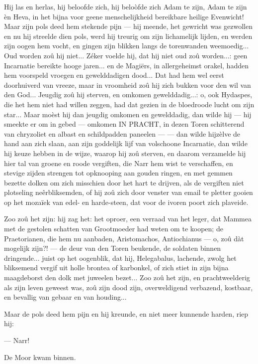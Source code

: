 \documentclass[a4paper, 12pt, oneside, dutch]{article}
\begin{document}
Hij las en herlas, hij beloofde zich, hij beloòfde zich Adam te zijn, Adam te zijn èn Heva, in het bijna voor geene menschelijkheid bereikbare heilige Evenwicht! Maar zijn pols deed hem stekende pijn --- hij meende, het gewricht was gezwollen en nu hij streelde dien pols, werd hij treurig om zijn lichamelijk lijden, en werden zijn oogen hem vocht, en gingen zijn blikken langs de torenwanden weemoedig... Oud worden zoû hij niet... Zéker voelde hij, dat hij niet oud zoû worden...: geen Incarnatie bereikte hooge jaren... en de Magiërs, in allergeheimst orakel, hadden hem voorspeld vroegen en gewelddadigen dood... Dat had hem wel eerst doorhuiverd van vreeze, maar in vroomheid zoû hij zich bukken voor den wil van den God... Jeugdig zoû hij sterven, en omkomen gewelddadig...: o, ook Hydaspes, die het hem niet had willen zeggen, had dat gezien in de bloedroode lucht om zijn star... Maar moèst hij dan jeugdig omkomen en gewelddadig, dan wilde hij --- hij smeekte er om in gebed --- omkomen IN PRACHT, in dezen Toren schitterend van chryzoliet en albast en schildpadden paneelen ---  --- dan wilde hijzèlve de hand aan zich slaan, aan zijn goddelijk lijf van volschoone Incarnatie, dan wilde hij keuze hebben in de wijze, waarop hij zoû sterven, en daarom verzamelde hij hier tal van groene en roode vergiften, die Narr hem wist te verschaffen, en stevige zijden strengen tot opknooping aan gouden ringen, en met gemmen bezette dolken om zich misschien door het hart te drijven, als de vergiften niet plotseling neêrbliksemden, of hij zoû zich door venster van email te pletter gooien op het mozaïek van edel- en harde-steen, dat voor de ivoren poort zich plaveide.

Zoo zoû het zijn: hij zag het: het oproer, een verraad van het leger, dat Mammea met de gestolen schatten van Grootmoeder had weten om te koopen; de Praetorianen, die hem nu aanbaden, Aristomachos, Antiochianus --- o, zoû dàt mogelijk zijn?! --- de deur van den Toren beukende, de soldaten binnen dringende... juist op het oogenblik, dat hij, Helegabalus, lachende, zwolg het bliksemend vergif uit holle brontea of karbonkel, of zich stiet in zijn bijna maagdeborst den dolk met juweelen bezet... Zoo zoû het zijn, en prachtweelderig als zijn leven geweest was, zoû zijn dood zijn, overweldigend verbazend, kostbaar, en bevallig van gebaar en van houding...

Maar de pols deed hem pijn en hij kreunde, en niet meer kunnende harden, riep hij:

--- Narr!

De Moor kwam binnen.
\end{document}
